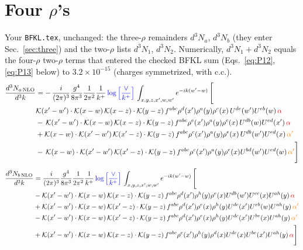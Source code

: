 \documentclass[10pt]{article}
\numberwithin{equation}{section}
\begin{document}
\section{Four \texorpdfstring{$\rho$}{rho}'s}\label{sec:four}
Your \texttt{BFKL.tex}, unchanged: the three-$\rho$ remainders $d^3N_a$, $d^3N_b$ (they enter Sec.~\ref{sec:three}) and the two-$\rho$ lists $d^3N_1$, $d^3N_2$. Numerically, $d^3N_1+d^3N_2$ equals the four-$\rho$ two-$\rho$ terms that entered the checked BFKL sum (Eqs.~\eqref{eq:P12}, \eqref{eq:P13} below) to $3.2\times10^{-15}$ (charges symmetrized, with c.c.).
\begin{align}
    \frac{d^{3}N_{a\,\rm NLO}}{d^{3}k} & = -\,\frac{i}{(2\pi)^{3}}\frac{g^{4}}{8\pi^{3}}\frac{1}{2\pi^{2}} \frac{1}{k^{+}}\,{\color{blue}\log{\left[\frac{\vee}{k^{+}}\right]}}\,\int_{x,y,z,x^{\prime},w,w^{\prime}}e^{-ik(w^{\prime}-w)}\, \Bigg[\notag \\ &  \mathcal{K}(x'-w')\cdot \mathcal{K}(x-w)\, \mathcal{K}(x-z)\cdot \mathcal{K}(y-z)\, f^{a b c} \rho^{d}(x') \rho^{a}(y) \rho^{c}(x)\,U^{d e}(w') U^{e b}(w)\, {\color{red} \alpha} \nonumber\\
    &  -\,\mathcal{K}(x'-w')\cdot \mathcal{K}(x-w)\, \mathcal{K}(x-z)\cdot \mathcal{K}(y-z)\, f^{a b c} \rho^{e}(x') \rho^{a}(y) \rho^{c}(x)\, U^{d b}(w) U^{e d}(x')\, {\color{red} \alpha}\nonumber\\
    & + \mathcal{K}(x-w)\cdot \mathcal{K}(x'-w')\, \mathcal{K}(x'-z)\cdot \mathcal{K}(y-z)\, f^{a b c} \rho^{c}(x') \rho^{a}(y) \rho^{e}(x)\,U^{d b}(w') U^{e d}(x)\, {\color{orange} \alpha'} \nonumber\\
    & -\,\mathcal{K}(x-w)\cdot \mathcal{K}(x'-w')\, \mathcal{K}(x'-z)\cdot \mathcal{K}(y-z)\, f^{a b c} \rho^{c}(x') \rho^{a}(y) \rho^{e}(x) U^{b d}(w') U^{e d}(w)\, {\color{orange} \alpha'}\Bigg]
\end{align}
\begin{align}
      \frac{d^{3}N_{b\,\rm NLO}}{d^{3}k} & = \frac{i}{(2\pi)^{3}}\frac{g^{4}}{8\pi^{3}}\frac{1}{2\pi^{2}} \frac{1}{k^{+}}\,{\color{blue}\log{\left[\frac{\vee}{k^{+}}\right]}}\,\int_{x,y,z,x^{\prime},w,w^{\prime}}e^{-ik(w^{\prime}-w)}\, \Bigg[\notag \\ & - \mathcal{K}(x'-w')\cdot \mathcal{K}(x-w)\, \mathcal{K}(x-z)\cdot \mathcal{K}(y-z)\, f^{a b c} \rho^{d}(x') \rho^{h}(y) \rho^{e}(x) U^{d b}(w') U^{e c}(x) U^{a h}(y)\, {\color{red} \alpha}\nonumber\\
    &+ \mathcal{K}(x'-w')\cdot \mathcal{K}(x-w)\,\mathcal{K}(x'-z)\cdot \mathcal{K}(y-z)\, f^{a b c} \rho^{d}(x') \rho^{e}(x) \rho^{h}(y) U^{d c}(x') U^{e b}(w) U^{a h}(y)\, {\color{orange} \alpha'}\nonumber\\
    &- \mathcal{K}(x'-w')\cdot \mathcal{K}(x-w)\,\mathcal{K}(x'-z)\cdot \mathcal{K}(y-z)\, f^{a b c} \rho^{d}(x') \rho^{e}(x) \rho^{h}(y) U^{d c}(x') U^{b e}(x) U^{a h}(y)\, {\color{orange} \alpha'}\nonumber\\
    &+  \mathcal{K}(x'-w')\cdot \mathcal{K}(x-w)\, \mathcal{K}(x-z)\cdot \mathcal{K}(y-z)\, f^{a b c} \rho^{e}(x') \rho^{h}(y) \rho^{d}(x) U^{d c}(x) U^{b e}(x') U^{a h}(y)\, {\color{red} \alpha} \Bigg]
\end{align}
\end{document}
